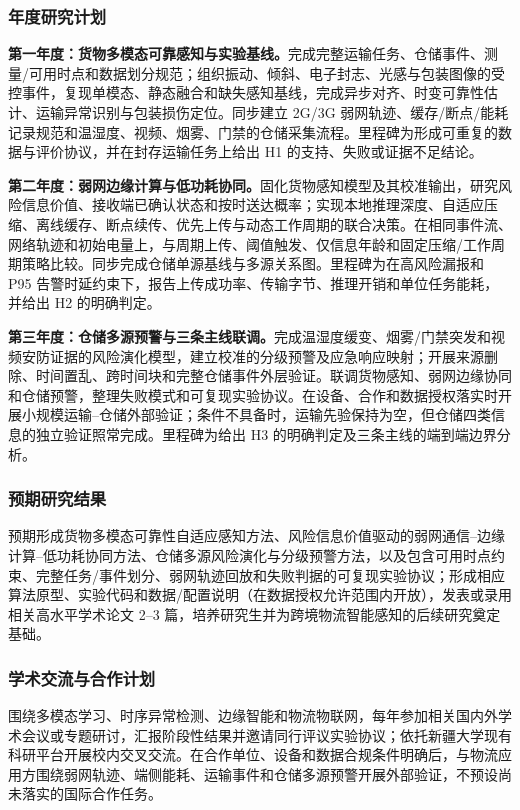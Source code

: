 \justifying
\NSFCBodyText

\subsubsection{年度研究计划}

\textbf{第一年度：货物多模态可靠感知与实验基线。}完成完整运输任务、仓储事件、测量/可用时点和数据划分规范；组织振动、倾斜、电子封志、光感与包装图像的受控事件，复现单模态、静态融合和缺失感知基线，完成异步对齐、时变可靠性估计、运输异常识别与包装损伤定位。同步建立 2G/3G 弱网轨迹、缓存/断点/能耗记录规范和温湿度、视频、烟雾、门禁的仓储采集流程。里程碑为形成可重复的数据与评价协议，并在封存运输任务上给出 H1 的支持、失败或证据不足结论。

\textbf{第二年度：弱网边缘计算与低功耗协同。}固化货物感知模型及其校准输出，研究风险信息价值、接收端已确认状态和按时送达概率；实现本地推理深度、自适应压缩、离线缓存、断点续传、优先上传与动态工作周期的联合决策。在相同事件流、网络轨迹和初始电量上，与周期上传、阈值触发、仅信息年龄和固定压缩/工作周期策略比较。同步完成仓储单源基线与多源关系图。里程碑为在高风险漏报和 P95 告警时延约束下，报告上传成功率、传输字节、推理开销和单位任务能耗，并给出 H2 的明确判定。

\textbf{第三年度：仓储多源预警与三条主线联调。}完成温湿度缓变、烟雾/门禁突发和视频安防证据的风险演化模型，建立校准的分级预警及应急响应映射；开展来源删除、时间置乱、跨时间块和完整仓储事件外层验证。联调货物感知、弱网边缘协同和仓储预警，整理失败模式和可复现实验协议。在设备、合作和数据授权落实时开展小规模运输--仓储外部验证；条件不具备时，运输先验保持为空，但仓储四类信息的独立验证照常完成。里程碑为给出 H3 的明确判定及三条主线的端到端边界分析。

\subsubsection{预期研究结果}

预期形成货物多模态可靠性自适应感知方法、风险信息价值驱动的弱网通信--边缘计算--低功耗协同方法、仓储多源风险演化与分级预警方法，以及包含可用时点约束、完整任务/事件划分、弱网轨迹回放和失败判据的可复现实验协议；形成相应算法原型、实验代码和数据/配置说明（在数据授权允许范围内开放），发表或录用相关高水平学术论文 2--3 篇，培养研究生并为跨境物流智能感知的后续研究奠定基础。

\subsubsection{学术交流与合作计划}

围绕多模态学习、时序异常检测、边缘智能和物流物联网，每年参加相关国内外学术会议或专题研讨，汇报阶段性结果并邀请同行评议实验协议；依托新疆大学现有科研平台开展校内交叉交流。在合作单位、设备和数据合规条件明确后，与物流应用方围绕弱网轨迹、端侧能耗、运输事件和仓储多源预警开展外部验证，不预设尚未落实的国际合作任务。
